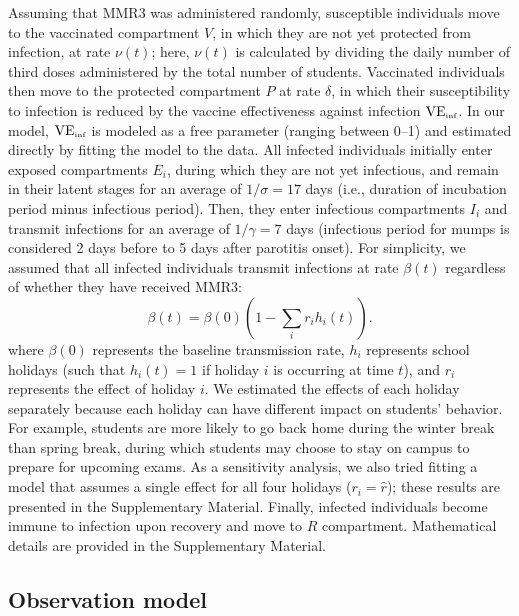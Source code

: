 \documentclass[12pt]{article}
\begin{document}
Assuming that MMR3 was administered randomly, susceptible individuals move to the vaccinated compartment $V$, in which they are not yet protected from infection, at rate $\nu(t)$; 
here, $\nu(t)$ is calculated by dividing the daily number of third doses administered by the total number of students.
Vaccinated individuals then move to the protected compartment $P$ at rate $\delta$, in which their susceptibility to infection is reduced by the vaccine effectiveness against infection $\mathrm{VE}_{\textrm{\tiny{inf}}}$.
In our model, $\mathrm{VE}_{\textrm{\tiny{inf}}}$ is modeled as a free parameter (ranging between 0--1) and estimated directly by fitting the model to the data.
All infected individuals initially enter exposed compartments $E_i$, during which they are not yet infectious, and remain in their latent stages for an average of $1/\sigma=17$ days (i.e., duration of incubation period minus infectious period).
Then, they enter infectious compartments $I_i$ and transmit infections for an average of $1/\gamma=7$ days (infectious period for mumps is considered 2 days before to 5 days after parotitis onset).
For simplicity, we assumed that all infected individuals transmit infections at rate $\beta(t)$ regardless of whether they have received MMR3:
\begin{equation}
\beta(t) = \beta(0) \left(1 - \sum_i r_i h_i(t)\right).
\label{eq:beta}
\end{equation}
where $\beta(0)$ represents the baseline transmission rate, $h_i$ represents school holidays (such that $h_i(t) = 1$ if holiday $i$ is occurring at time $t$), and $r_i$ represents the effect of holiday $i$.
We estimated the effects of each holiday separately because each holiday can have different impact on students' behavior.
For example, students are more likely to go back home during the winter break than spring break, during which students may choose to stay on campus to prepare for upcoming exams.
As a sensitivity analysis, we also tried fitting a model that assumes a single effect for all four holidays ($r_i = \hat{r}$); these results are presented in the Supplementary Material.
Finally, infected individuals become immune to infection upon recovery and move to $R$ compartment.
Mathematical details are provided in the Supplementary Material.

\subsection{Observation model}
\end{document}
